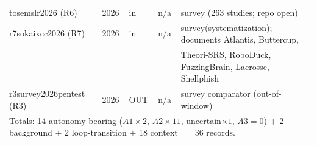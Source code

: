 \begin{table}[t]
{\begin{tabular}{lllll}
tosemslr2026 (R6)        & 2026 & in & n/a & survey (263 studies; repo open) \\
r7sokaixcc2026 (R7)      & 2026 & in & n/a & survey(systematization); documents Atlantis, Buttercup,\\
                         &      &    &     & Theori-SRS, RoboDuck, FuzzingBrain, Lacrosse, Shellphish \\
r3survey2026pentest (R3) & 2026 & OUT& n/a & survey comparator (out-of-window) \\
\hline
\multicolumn{5}{l}{\scriptsize Totals: 14 autonomy-bearing ($A1{\times}2$, $A2{\times}11$, uncertain${\times}1$, $A3{=}0$)
$+$ 2 background $+$ 2 loop-transition $+$ 18 context $=$ 36 records.}\\
\end{tabular}
}
\end{table}
